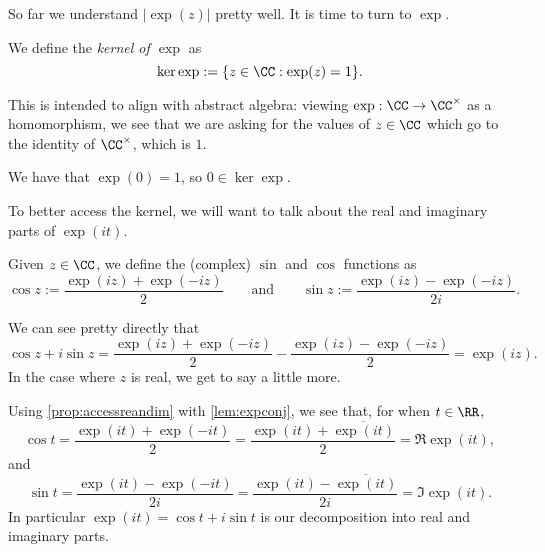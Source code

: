 So far we understand $|\exp(z)|$ pretty well. It is time to turn to $\exp$.
\begin{definition}
	We define the \textit{kernel of $\exp$} as
	\[\ker\exp:=\{z\in\CC:\exp(z)=1\}.\]
\end{definition}
\begin{remark}
	This is intended to align with abstract algebra: viewing $\exp:\CC\to\CC^\times$ as a homomorphism, we see that we are asking for the values of $z\in\CC$ which go to the identity of $\CC^\times$, which is $1$.
\end{remark}
\begin{example}
	We have that $\exp(0)=1$, so $0\in\ker\exp$.
\end{example}
To better access the kernel, we will want to talk about the real and imaginary parts of $\exp(it)$.
\begin{definition}
	Given $z\in\CC$, we define the (complex) $\sin$ and $\cos$ functions as
	\[\cos z:=\frac{\exp(iz)+\exp(-iz)}{2}\qquad\text{and}\qquad\sin z:=\frac{\exp(iz)-\exp(-iz)}{2i}.\]
\end{definition}
We can see pretty directly that
\[\cos z+i\sin z=\frac{\exp(iz)+\exp(-iz)}2-\frac{\exp(iz)-\exp(-iz)}2=\exp(iz).\]
In the case where $z$ is real, we get to say a little more.
\begin{remark} \label{rem:reandimexp}
	Using \autoref{prop:accessreandim} with \autoref{lem:expconj}, we see that, for when $t\in\RR$,
	\[\cos t=\frac{\exp(it)+\exp(-it)}{2}=\frac{\exp(it)+\overline{\exp(it)}}2=\Re\exp(it),\]
	and
	\[\sin t=\frac{\exp(it)-\exp(-it)}{2i}=\frac{\exp(it)-\overline{\exp(it)}}{2i}=\Im\exp(it).\]
	In particular $\exp(it)=\cos t+i\sin t$ is our decomposition into real and imaginary parts.
\end{remark}

